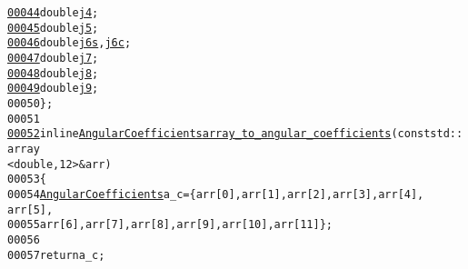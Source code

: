 \begin{footnotesize}
\begin{alltt}
\hypertarget{exclusive-b-to-s-dilepton_8hh_source_l00044}{}\hyperlink{structeos_1_1btovll_1_1AngularCoefficients_a248d3de3ef06f5b0df8a81bb9b1cb386}{00044}             \textcolor{keywordtype}{double} \hyperlink{structeos_1_1btovll_1_1AngularCoefficients_a248d3de3ef06f5b0df8a81bb9b1cb386}{j4};
\hypertarget{exclusive-b-to-s-dilepton_8hh_source_l00045}{}\hyperlink{structeos_1_1btovll_1_1AngularCoefficients_a45c7c0b871babc4ab2d9f154621bcbba}{00045}             \textcolor{keywordtype}{double} \hyperlink{structeos_1_1btovll_1_1AngularCoefficients_a45c7c0b871babc4ab2d9f154621bcbba}{j5};
\hypertarget{exclusive-b-to-s-dilepton_8hh_source_l00046}{}\hyperlink{structeos_1_1btovll_1_1AngularCoefficients_a131fac85c7f41b3f45fa48d813cfe5fe}{00046}             \textcolor{keywordtype}{double} \hyperlink{structeos_1_1btovll_1_1AngularCoefficients_a131fac85c7f41b3f45fa48d813cfe5fe}{j6s}, \hyperlink{structeos_1_1btovll_1_1AngularCoefficients_a9864a2cce9206c5b1575506662e3931b}{j6c};
\hypertarget{exclusive-b-to-s-dilepton_8hh_source_l00047}{}\hyperlink{structeos_1_1btovll_1_1AngularCoefficients_a4315cb971112dcdab72fd3f35d32b0c1}{00047}             \textcolor{keywordtype}{double} \hyperlink{structeos_1_1btovll_1_1AngularCoefficients_a4315cb971112dcdab72fd3f35d32b0c1}{j7};
\hypertarget{exclusive-b-to-s-dilepton_8hh_source_l00048}{}\hyperlink{structeos_1_1btovll_1_1AngularCoefficients_ae45771328384f52d01da8de89ac47daa}{00048}             \textcolor{keywordtype}{double} \hyperlink{structeos_1_1btovll_1_1AngularCoefficients_ae45771328384f52d01da8de89ac47daa}{j8};
\hypertarget{exclusive-b-to-s-dilepton_8hh_source_l00049}{}\hyperlink{structeos_1_1btovll_1_1AngularCoefficients_a316582a2eb00530ecde513187e29fe18}{00049}             \textcolor{keywordtype}{double} \hyperlink{structeos_1_1btovll_1_1AngularCoefficients_a316582a2eb00530ecde513187e29fe18}{j9};
00050         \};
00051 
\hypertarget{exclusive-b-to-s-dilepton_8hh_source_l00052}{}\hyperlink{namespaceeos_1_1btovll_af4a61503514b02cdc2239f33915ac237}{00052}         \textcolor{keyword}{inline} \hyperlink{structeos_1_1btovll_1_1AngularCoefficients}{AngularCoefficients} \hyperlink{namespaceeos_1_1btovll_af4a61503514b02cdc2239f33915ac237}{array_to_angular_coefficients}(\textcolor{keyword}{const} std::array
      <double, 12> & arr)
00053         \{
00054             \hyperlink{structeos_1_1btovll_1_1AngularCoefficients}{AngularCoefficients} a\_c = \{ arr[0], arr[1], arr[2], arr[3], arr[4],  
      arr[5],
00055                 arr[6], arr[7], arr[8], arr[9], arr[10], arr[11] \};
00056 
00057             \textcolor{keywordflow}{return} a\_c;

\end{alltt}
\end{footnotesize}
